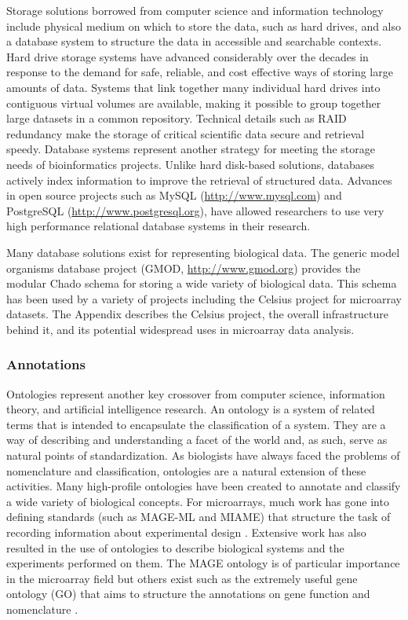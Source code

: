 Storage solutions borrowed from computer science and information technology
include physical medium on which to store the data, such as hard drives, and also a
database system to structure the data in accessible and searchable contexts.
Hard drive storage systems have advanced considerably over the decades in
response to the demand for safe, reliable, and cost effective ways of storing
large amounts of data.  Systems that link together many individual hard drives
into contiguous virtual volumes are available, making it possible to group
together large datasets in a common repository.  Technical details such as RAID
redundancy make the storage of critical scientific data secure and retrieval
speedy.  Database systems represent another strategy for meeting the storage
needs of bioinformatics projects.  Unlike hard disk-based solutions, databases
actively index information to improve the retrieval of structured data.
Advances in open source projects such as MySQL (\url{http://www.mysql.com}) and
PostgreSQL (\url{http://www.postgresql.org}), have allowed researchers to use
very high performance relational database systems in their research.

Many database solutions exist for representing biological data.  The generic
model organisms database project (GMOD, \url{http://www.gmod.org}) provides the
modular Chado schema for storing a wide variety of biological data.  This
schema has been used by a variety of projects including the Celsius project for
microarray datasets.  The Appendix describes the Celsius project,
the overall infrastructure behind it, and its potential widespread uses in
microarray data analysis.

\subsubsection{Annotations}

Ontologies represent another key crossover from computer science, information
theory, and artificial intelligence research.  An ontology is a system of
related terms that is intended to encapsulate the classification of a system.
They are a way of describing and understanding a facet of the world and, as such,
serve as natural points of standardization.  As biologists have always faced
the problems of nomenclature and classification, ontologies are a natural
extension of these activities.  Many high-profile ontologies have been created
to annotate and classify a wide variety of biological concepts.  For
microarrays, much work has gone into defining standards (such as MAGE-ML and
MIAME) that structure the task of recording information about experimental
design \cite{brazma2001mim}. Extensive work has also resulted in the use of
ontologies to describe biological systems and the experiments performed on
them.  The MAGE ontology is of particular importance in the microarray field
but others exist such as the extremely useful gene ontology (GO) that aims to
structure the annotations on gene function and nomenclature
\cite{stoeckert2003mof,ashburner2000got}.

